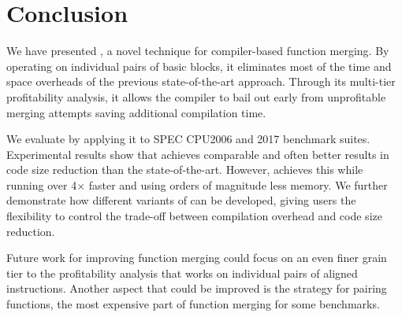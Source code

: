 \section{Conclusion}


We have presented \ProjName, a novel technique for compiler-based function merging. By operating on individual pairs of basic blocks, it eliminates most of the time and space overheads of the previous state-of-the-art approach. Through its multi-tier profitability analysis, it allows the compiler to bail out early from unprofitable merging attempts saving additional compilation time.

We evaluate \ProjName by applying it to SPEC CPU2006 and 2017 benchmark suites. Experimental results show that  \ProjName achieves comparable and often better results in code size reduction than the state-of-the-art. However, \ProjName achieves this while running over 4$\times$ faster and using orders of magnitude less memory. We further demonstrate how different variants of \ProjName can be developed, giving users the flexibility to control the trade-off between compilation overhead and code size reduction. 

Future work for improving function merging could focus on an even finer grain tier to the profitability analysis that works on individual pairs of aligned instructions. Another aspect that could be improved is the strategy for pairing functions, the most expensive part of function merging for some benchmarks.